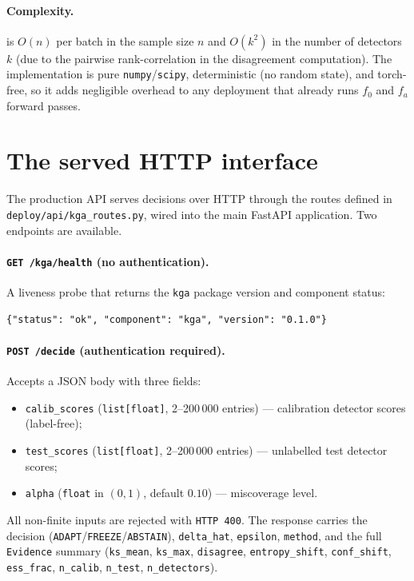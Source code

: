 \paragraph{Complexity.}
\KGA{} is $O(n)$ per batch in the sample size $n$ and $O(k^2)$ in the number of
detectors $k$ (due to the pairwise rank-correlation in the disagreement
computation).  The implementation is pure \texttt{numpy}/\texttt{scipy},
deterministic (no random state), and torch-free, so it adds negligible overhead
to any deployment that already runs $f_0$ and $f_a$ forward passes.

\section{The served HTTP interface}
\label{sec:kga-http}

The production API serves \KGA{} decisions over HTTP through the routes defined
in \texttt{deploy/api/kga\_routes.py}, wired into the main FastAPI application.
Two endpoints are available.

\paragraph{\texttt{GET /kga/health} (no authentication).}
A liveness probe that returns the \texttt{kga} package version and component
status:

\begin{verbatim}
{"status": "ok", "component": "kga", "version": "0.1.0"}
\end{verbatim}

\paragraph{\texttt{POST /decide} (authentication required).}
Accepts a JSON body with three fields:
\begin{itemize}
  \item \texttt{calib\_scores} (\texttt{list[float]}, 2--200\,000 entries) ---
    calibration detector scores (label-free);
  \item \texttt{test\_scores} (\texttt{list[float]}, 2--200\,000 entries) ---
    unlabelled test detector scores;
  \item \texttt{alpha} (\texttt{float} in $(0,1)$, default $0.10$) ---
    miscoverage level.
\end{itemize}
All non-finite inputs are rejected with \texttt{HTTP 400}.  The response carries
the decision (\texttt{ADAPT}/\texttt{FREEZE}/\texttt{ABSTAIN}),
\texttt{delta\_hat}, \texttt{epsilon}, \texttt{method}, and the full
\texttt{Evidence} summary (\texttt{ks\_mean}, \texttt{ks\_max},
\texttt{disagree}, \texttt{entropy\_shift}, \texttt{conf\_shift},
\texttt{ess\_frac}, \texttt{n\_calib}, \texttt{n\_test}, \texttt{n\_detectors}).

